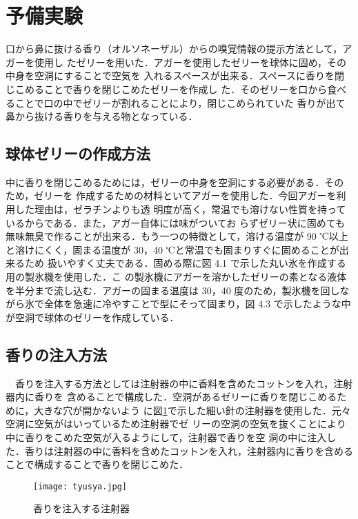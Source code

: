 \section{予備実験}

口から鼻に抜ける香り（オルソネーザル）からの嗅覚情報の提示方法として，アガーを使用し
たゼリーを用いた．アガーを使用したゼリーを球体に固め，その中身を空洞にすることで空気を
入れるスペースが出来る．スペースに香りを閉じこめることで香りを閉じこめたゼリーを作成し
た．そのゼリーを口から食べることで口の中でゼリーが割れることにより，閉じこめられていた
香りが出て鼻から抜ける香りを与える物となっている．


\subsection{球体ゼリーの作成方法}

中に香りを閉じこめるためには，ゼリーの中身を空洞にする必要がある．そのため，ゼリーを
作成するための材料といてアガーを使用した．今回アガーを利用した理由は，ゼラチンよりも透
明度が高く，常温でも溶けない性質を持っているからである．また，アガー自体には味がついてお
らずゼリー状に固めても無味無臭で作ることが出来る．もう一つの特徴として，溶ける温度が 90
℃以上と溶けにくく，固まる温度が 30，40 ℃と常温でも固まりすぐに固めることが出来るため
扱いやすく丈夫である．固める際に図 4.1 で示した丸い氷を作成する用の製氷機を使用した．こ
の製氷機にアガーを溶かしたゼリーの素となる液体を半分まで流し込む．アガーの固まる温度は
30，40 度のため，製氷機を回しながら氷で全体を急速に冷やすことで型にそって固まり，図 4.3
で示したような中が空洞で球体のゼリーを作成している．


\subsection{香りの注入方法}
　香りを注入する方法としては注射器の中に香料を含めたコットンを入れ，注射器内に香りを
含めることで構成した．空洞があるゼリーに香りを閉じこめるために，大きな穴が開かないよう
に図\ref{tyusya}で示した細い針の注射器を使用した．元々空洞に空気がはいっているため注射器でゼ
リーの空洞の空気を抜くことにより中に香りをこめた空気が入るようにして，注射器で香りを空
洞の中に注入した．香りは注射器の中に香料を含めたコットンを入れ，注射器内に香りを含める
ことで構成することで香りを閉じこめた．

\begin{figure}[h]
    \centering
    \texttt{[image: tyusya.jpg]}
    \caption{香りを注入する注射器}
    \label{tyusya}
  \end{figure}



